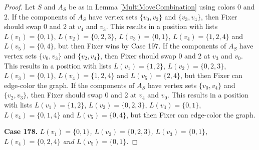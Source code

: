 \documentclass[12pt]{amsart}
\theoremstyle{plain}
\theoremstyle{definition}
\theoremstyle{remark}
\begin{document}
\begin{proof}
Let $S$ and $A_S$ be as in Lemma \ref{MultiMoveCombination} using colors $0$ and $2$. If the components of $A_S$ have vertex sets $\{v_0, v_2\}$ and $\{v_3, v_4\}$, then Fixer should swap 0 and 2 at $v_4$ and $v_3$. This results in a position with lists $L(v_1) = \{0, 1\}$, $L(v_2) = \{0, 2, 3\}$, $L(v_3) = \{0, 1\}$, $L(v_4) = \{1, 2, 4\}$ and $L(v_5) = \{0, 4\}$, but then Fixer wins by Case 197.
If the components of $A_S$ have vertex sets $\{v_0, v_3\}$ and $\{v_2, v_4\}$, then Fixer should swap 0 and 2 at $v_3$ and $v_0$. This results in a position with lists $L(v_1) = \{1, 2\}$, $L(v_2) = \{0, 2, 3\}$, $L(v_3) = \{0, 1\}$, $L(v_4) = \{1, 2, 4\}$ and $L(v_5) = \{2, 4\}$, but then Fixer can edge-color the graph.
If the components of $A_S$ have vertex sets $\{v_0, v_4\}$ and $\{v_2, v_3\}$, then Fixer should swap 0 and 2 at $v_4$ and $v_0$. This results in a position with lists $L(v_1) = \{1, 2\}$, $L(v_2) = \{0, 2, 3\}$, $L(v_3) = \{0, 1\}$, $L(v_4) = \{0, 1, 4\}$ and $L(v_5) = \{0, 4\}$, but then Fixer can edge-color the graph.

\noindent\textbf{Case 178.  }\textit{$L(v_1) = \{0, 1\}$, $L(v_2) = \{0, 2, 3\}$, $L(v_3) = \{0, 1\}$, $L(v_4) = \{0, 2, 4\}$ and $L(v_5) = \{0, 1\}$.}


\end{proof}
\end{document}
